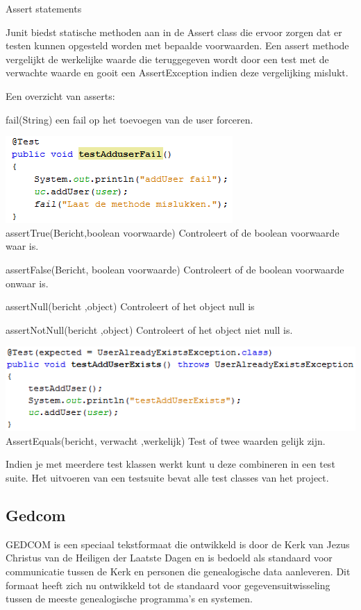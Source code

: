 \documentclass[pdftex,a4paper,12pt,twoside]{report}
\begin{document}
Assert statements

Junit biedst statische methoden aan in de Assert class die ervoor zorgen dat er testen kunnen opgesteld worden met bepaalde voorwaarden.
Een assert methode vergelijkt de werkelijke waarde die teruggegeven wordt door een test met de verwachte waarde en gooit een AssertException indien deze vergelijking mislukt.

Een overzicht van asserts:

fail(String)
een fail op het toevoegen van de user forceren.

\includegraphics{images/adduserfail.png}\\

assertTrue(Bericht,boolean voorwaarde)
Controleert of de boolean voorwaarde waar is.

assertFalse(Bericht, boolean voorwaarde)
Controleert of de boolean voorwaarde onwaar is.

assertNull(bericht ,object)
Controleert of het object null is

assertNotNull(bericht ,object)
Controleert of het object niet null is.

\includegraphics{images/junit3.png}\\

AssertEquals(bericht, verwacht ,werkelijk)
Test of twee waarden gelijk zijn.

Indien je met meerdere test klassen werkt kunt u deze combineren in een test suite.
Het uitvoeren van een testsuite bevat alle test classes van het project.




\subsection{Gedcom}

GEDCOM is een speciaal tekstformaat die ontwikkeld is door de Kerk van Jezus Christus van de Heiligen der Laatste Dagen en is bedoeld als standaard voor communicatie tussen de Kerk en personen die genealogische data aanleveren.
Dit formaat heeft zich nu ontwikkeld tot de standaard voor gegevensuitwisseling tussen de meeste genealogische programma's en systemen.
\end{document}
